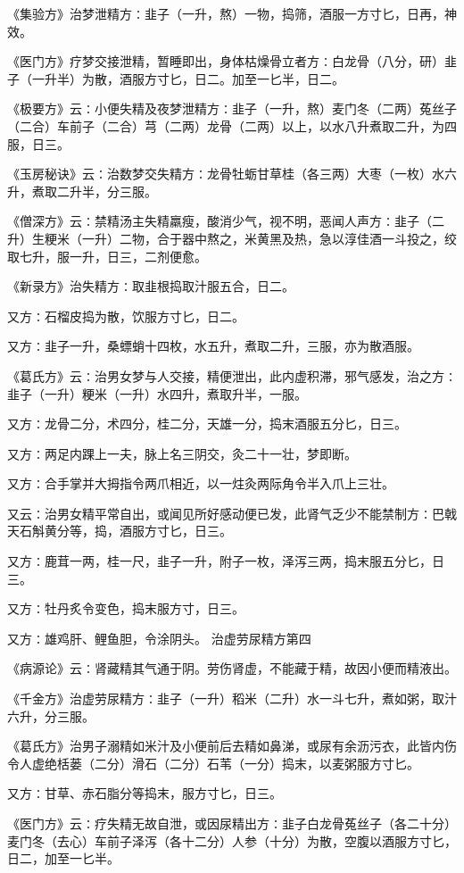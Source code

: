 \documentclass[a4paper,12pt,UTF8,twoside]{ctexbook}
\begin{document}
《集验方》治梦泄精方∶韭子（一升，熬）一物，捣筛，酒服一方寸匕，日再，神效。

《医门方》疗梦交接泄精，暂睡即出，身体枯燥骨立者方∶白龙骨（八分，研）韭子（一升半）为散，酒服方寸匕，日二。加至一匕半，日二。

《极要方》云∶小便失精及夜梦泄精方∶韭子（一升，熬）麦门冬（二两）菟丝子（二合）车前子（二合）芎（二两）龙骨（二两）以上，以水八升煮取二升，为四服，日三。

《玉房秘诀》云∶治数梦交失精方∶龙骨牡蛎甘草桂（各三两）大枣（一枚）水六升，煮取二升半，分三服。

《僧深方》云∶禁精汤主失精羸瘦，酸消少气，视不明，恶闻人声方∶韭子（二升）生粳米（一升）二物，合于器中熬之，米黄黑及热，急以淳佳酒一斗投之，绞取七升，服一升，日三，二剂便愈。

《新录方》治失精方∶取韭根捣取汁服五合，日二。

又方∶石榴皮捣为散，饮服方寸匕，日二。

又方∶韭子一升，桑螵蛸十四枚，水五升，煮取二升，三服，亦为散酒服。

《葛氏方》云∶治男女梦与人交接，精便泄出，此内虚积滞，邪气感发，治之方∶韭子（一升）粳米（一升）水四升，煮取升半，一服。

又方∶龙骨二分，术四分，桂二分，天雄一分，捣末酒服五分匕，日三。

又方∶两足内踝上一夫，脉上名三阴交，灸二十一壮，梦即断。

又方∶合手掌并大拇指令两爪相近，以一炷灸两际角令半入爪上三壮。

又云∶治男女精平常自出，或闻见所好感动便已发，此肾气乏少不能禁制方∶巴戟天石斛黄分等，捣，酒服方寸匕，日三。

又方∶鹿茸一两，桂一尺，韭子一升，附子一枚，泽泻三两，捣末服五分匕，日三。

又方∶牡丹炙令变色，捣末服方寸，日三。

又方∶雄鸡肝、鲤鱼胆，令涂阴头。
治虚劳尿精方第四

《病源论》云∶肾藏精其气通于阴。劳伤肾虚，不能藏于精，故因小便而精液出。

《千金方》治虚劳尿精方∶韭子（一升）稻米（二升）水一斗七升，煮如粥，取汁六升，分三服。

《葛氏方》治男子溺精如米汁及小便前后去精如鼻涕，或尿有余沥污衣，此皆内伤令人虚绝栝蒌（二分）滑石（二分）石苇（一分）捣末，以麦粥服方寸匕。

又方∶甘草、赤石脂分等捣末，服方寸匕，日三。

《医门方》云∶疗失精无故自泄，或因尿精出方∶韭子白龙骨菟丝子（各二十分）麦门冬（去心）车前子泽泻（各十二分）人参（十分）为散，空腹以酒服方寸匕，日二，加至一匕半。
\end{document}
